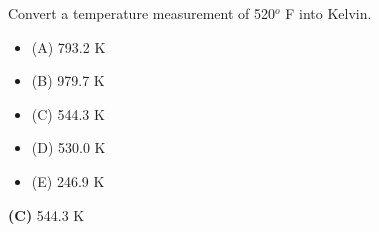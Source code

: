 

Convert a temperature measurement of 520$^{o}$ F into Kelvin.

\begin{itemize}
\item{(A)} 793.2 K
\vskip 5pt 
\item{(B)} 979.7 K
\vskip 5pt 
\item{(C)} 544.3 K
\vskip 5pt 
\item{(D)} 530.0 K
\vskip 5pt 
\item{(E)} 246.9 K
\end{itemize}







{\bf (C)} 544.3 K
 









